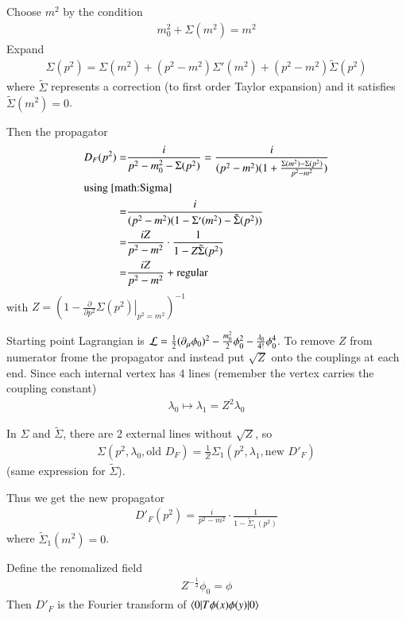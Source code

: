 Choose $m^2$ by the condition 
\begin{align}
	m_0^2 + \Sigma(m^2) = m^2
\end{align}
Expand
\begin{align}\label{math:Sigma}
	\Sigma(p^2) = \Sigma(m^2) + (p^2 - m^2) \Sigma'(m^2) + (p^2 - m^2)\tilde{\Sigma}(p^2)
\end{align}
where $\tilde{\Sigma}$ represents a correction (to first order Taylor expansion) and it satisfies $\tilde{\Sigma}(m^2) = 0$.

Then the propagator
\begin{align}
	D_F(p^2) =& \frac{i}{p^2 - m^2_0 - \Sigma(p^2)} = \frac{i}{(p^2 - m^2)(1+\frac{\Sigma(m^2)-\Sigma(p^2)}{p^2 - m^2})} \notag \\
	\shortintertext{using \ref{math:Sigma}}
	=& \frac{i}{(p^2 - m^2)(1-\Sigma'(m^2)-\tilde{\Sigma}(p^2))} \notag\\
	=& \frac{iZ}{p^2 - m^2} \cdot \frac{1}{1-Z\tilde{\Sigma}(p^2)} \notag \\
	=& \frac{iZ}{p^2 - m^2} + \text{regular}
\end{align}
with $Z = \left( 1 - \frac{\partial}{\partial p^2} \left.\Sigma(p^2)\right\rvert_{p^2 = m^2} \right)^{-1}$

Starting point Lagrangian is $\mathcal{L} = \frac{1}{2}(\partial_\mu \phi_0)^2 - \frac{m^2_0}{2}\phi_0^2 - \frac{\lambda_0}{4!}\phi_0^4$. To remove $Z$ from numerator frome the propagator and instead put $\sqrt{Z}$ onto the couplings at each end. Since each internal vertex has 4 lines (remember the vertex carries the coupling constant)
\begin{align}
	\lambda_0 \longmapsto \lambda_1 = Z^2 \lambda_0
\end{align}

In $\Sigma$ and $\tilde{\Sigma}$, there are 2 external lines without $\sqrt{Z}$, so
\begin{align}
	\Sigma(p^2, \lambda_0, \text{old } D_F) = \frac{1}{Z} \Sigma_1(p^2, \lambda_1, \text{new } D'_F)
\end{align}
(same expression for $\tilde{\Sigma}$).

Thus we get the new propagator
\begin{align}
	D'_F(p^2) = \frac{i}{p^2 - m^2} \cdot \frac{1}{1-\tilde{\Sigma}_1(p^2)}
\end{align}
where $\tilde{\Sigma}_1(m^2) = 0$.

Define the renomalized field
\begin{align}
	Z^{-\frac{1}{2}} \phi_0 = \phi
\end{align}
Then $D'_F$ is the Fourier transform of $\braket{0 | T\phi(x)\phi(y) | 0}$

